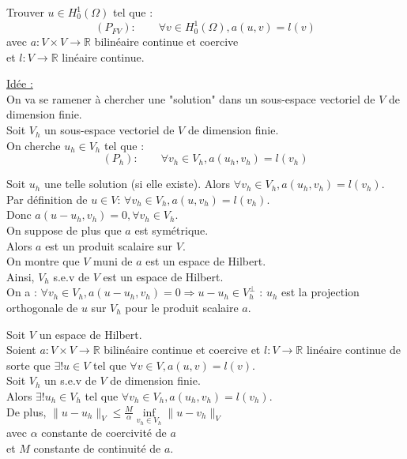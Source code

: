 \documentclass[12pt,a4paper]{article}
\newcommand{\propriete}[2]{%
    \begin{tcolorbox}[colback=white,colframe=green!25!white,title=\textbf{Propriété #1}, coltitle=black]
        #2
    \end{tcolorbox}
}
\newcommand{\important}[1]{%
    \begin{tcolorbox}[colback=red!10!white,colframe=red!30!black]
        #1
    \end{tcolorbox}
}
\begin{document}
\important{
    Trouver $u \in H^1_0(\Omega)$ tel que :
    \begin{equation}
        (P_{FV}) : \qquad \forall v \in H^1_0(\Omega), a(u, v) = l(v)
    \end{equation}
    avec $a : V \times V \rightarrow \mathbb{R}$ bilinéaire continue et coercive \\
    et $l : V \rightarrow \mathbb{R}$ linéaire continue.
}

\underline{Idée :} \\
On va se ramener à chercher une "solution" dans un sous-espace vectoriel de $V$ de dimension finie. \\

Soit $V_h$ un sous-espace vectoriel de $V$ de dimension finie. \\

On cherche $u_h \in V_h$ tel que :
\begin{equation}
    (P_h) : \qquad \forall v_h \in V_h, a(u_h, v_h) = l(v_h)
\end{equation}

Soit $u_h$ une telle solution (si elle existe).
Alors $\forall v_h \in V_h, a(u_h, v_h) = l(v_h)$. \\
Par définition de $u \in V$: $\forall v_h \in V_h, a(u, v_h) = l(v_h)$. \\
Donc $a(u - u_h, v_h) = 0, \forall v_h \in V_h$. \\

On suppose de plus que $a$ est symétrique. \\
Alors $a$ est un produit scalaire sur $V$. \\
On montre que $V$ muni de $a$ est un espace de Hilbert. \\
Ainsi, $V_h$ s.e.v de $V$ est un espace de Hilbert. \\

On a : $\forall v_h \in V_h, a(u - u_h, v_h) = 0 \Rightarrow u - u_h \in V_h^{\perp}$ : 
$u_h$ est la projection orthogonale de $u$ sur $V_h$ pour le produit scalaire $a$. \\

\propriete{- Lemme de Céa}{
    Soit $V$ un espace de Hilbert. \\
    Soient $a : V \times V \rightarrow \mathbb{R}$ bilinéaire continue et coercive et $l : V \rightarrow \mathbb{R}$ linéaire continue de sorte que $\exists! u \in V$ tel que $\forall v \in V, a(u, v) = l(v)$. \\
    Soit $V_h$ un s.e.v de $V$ de dimension finie. \\

    Alors $\exists! u_h \in V_h$ tel que $\forall v_h \in V_h, a(u_h, v_h) = l(v_h)$. \\

    De plus, $\| u - u_h \|_V \leq \frac{M}{\alpha} \underset{v_h \in V_h}{\inf} \| u - v_h \|_V$ \\
    avec $\alpha$ constante de coercivité de $a$ \\
    et $M$ constante de continuité de $a$.
}
\end{document}
